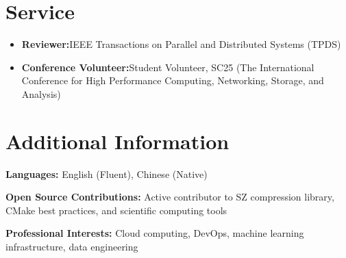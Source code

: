 \documentclass[a4paper,11pt]{article}
\newcommand{\resumeItem}[2]{
  \item{
    \textbf{#1}{\hspace{0.5mm}#2 \vspace{-0.5mm}}
  }
}
\newcommand{\resumeSubItem}[2]{\resumeItem{#1}{#2}\vspace{-4pt}}
\newcommand{\resumeHeadingSkillStart}{\begin{itemize}[leftmargin=*,itemsep=1.7mm, rightmargin=2ex]}
\newcommand{\resumeHeadingSkillEnd}{\end{itemize}\vspace{-2mm}}
\begin{document}
\section{\textbf{Service}}
\vspace{-0.4mm}
 \resumeHeadingSkillStart
  \resumeSubItem{Reviewer:}
    {IEEE Transactions on Parallel and Distributed Systems (TPDS)}
  \resumeSubItem{Conference Volunteer:}
    {Student Volunteer, SC25 (The International Conference for High Performance Computing, Networking, Storage, and Analysis)}
 \resumeHeadingSkillEnd

\vspace{-2mm}



\section{\textbf{Additional Information}}
\vspace{-0.4mm}
\small{
\textbf{Languages:} English (Fluent), Chinese (Native)

\textbf{Open Source Contributions:} Active contributor to SZ compression library, CMake best practices, and scientific computing tools

\textbf{Professional Interests:} Cloud computing, DevOps, machine learning infrastructure, data engineering
}
\vspace{-4mm}
\end{document}
